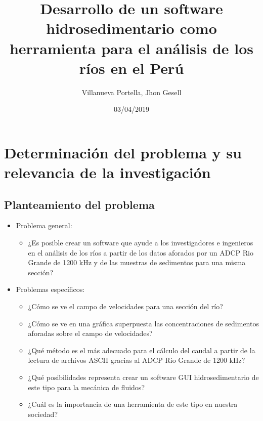 \documentclass[12pt,a4paper]{report}
\begin{document}
\title{Desarrollo de un software hidrosedimentario como herramienta para el análisis de los ríos en el Perú}
\author{Villanueva Portella, Jhon Gesell}
\date{03/04/2019}
\maketitle
\section{Determinación del problema y su relevancia de la investigación}

\subsection{Planteamiento del problema}
\begin{itemize}

\item Problema general:
	\begin{itemize}
	\item ¿Es posible crear un software que ayude a los investigadores e ingenieros en el análisis de los ríos a partir de los datos aforados por un ADCP Rio Grande de 1200 kHz y de las muestras de sedimentos para una misma sección?
	\end{itemize}
\item Problemas específicos:
	\begin{itemize}
	\item ¿Cómo se ve el campo de velocidades para una sección del río?
	\item ¿Cómo se ve en una gráfica superpuesta las concentraciones de sedimentos aforadas sobre el campo de velocidades?
	\item ¿Qué método es el más adecuado para el cálculo del caudal a partir de la lectura de archivos ASCII gracias al ADCP Rio Grande de 1200 kHz?
	\item ¿Qué posibilidades representa crear un software GUI hidrosedimentario de este tipo para la mecánica de fluidos?
	\item ¿Cuál es la importancia de una herramienta de este tipo en nuestra sociedad?
	\end{itemize}
\end{itemize}
\end{document}

